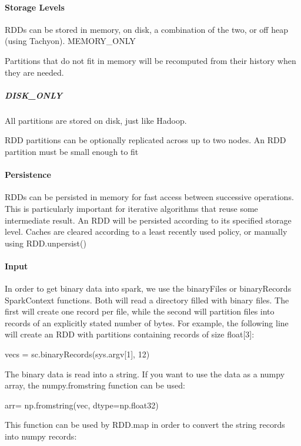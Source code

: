 \paragraph{Storage Levels}\label{storage-levels}

RDDs can be stored in memory, on disk, a combination of the two, or off
heap (using Tachyon). MEMORY\_ONLY

Partitions that do not fit in memory will be recomputed from their
history when they are needed.

\subparagraph{DISK\_ONLY}\label{diskux5fonly}

All partitions are stored on disk, just like Hadoop.

RDD partitions can be optionally replicated across up to two nodes. An
RDD partition must be small enough to fit

\paragraph{Persistence}\label{persistence}

RDDs can be persisted in memory for fast access between successive
operations. This is particularly important for iterative algorithms that
reuse some intermediate result. An RDD will be persisted according to
its specified storage level. Caches are cleared according to a least
recently used policy, or manually using RDD.unpersist()

\paragraph{Input}\label{input}

In order to get binary data into spark, we use the binaryFiles or
binaryRecords SparkContext functions. Both will read a directory filled
with binary files. The first will create one record per file, while the
second will partition files into records of an explicitly stated number
of bytes. For example, the following line will create an RDD with
partitions containing records of size float{[}3{]}:

vecs = sc.binaryRecords(sys.argv{[}1{]}, 12)

The binary data is read into a string. If you want to use the data as a
numpy array, the numpy.fromstring function can be used:

arr= np.fromstring(vec, dtype=np.float32)

This function can be used by RDD.map in order to convert the string
records into numpy records:

